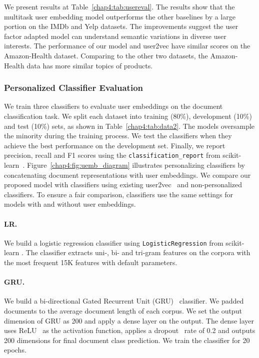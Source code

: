 We present results at Table~\ref{chap4:tab:usereval}.
The results show that the multitask user embedding model outperforms the other baselines by a large portion on the IMDb and Yelp datasets.
The improvements suggest the user factor adapted model can understand semantic variations in diverse user interests.
The performance of our model and user2vec have similar scores on the Amazon-Health dataset.
Comparing to the other two datasets, the Amazon-Health data has more similar topics of products.


\subsubsection{Personalized Classifier Evaluation}

We train three classifiers to evaluate user embeddings on the document classification task.
We split each dataset into training (80\%), development (10\%) and test (10\%) sets, as shown in Table~\ref{chap4:tab:data2}. 
The models oversample the minority during the training process.
We test the classifiers when they achieve the best performance on the development set.
Finally, we report precision, recall and F1 scores using the \texttt{classification\_report} from scikit-learn~\cite{pedregosa2011scikit}.
Figure~\ref{chap4:fig:uemb_diagram} illustrates personalizing classifiers by concatenating document representations with user embeddings.
We compare our proposed model with classifiers using existing user2vec~\cite{amir2017quantifying} and non-personalized classifiers.
To ensure a fair comparison, classifiers use the same settings for models with and without user embeddings.

\paragraph{LR.}
We build a logistic regression classifier using \texttt{LogisticRegression} from scikit-learn \cite{pedregosa2011scikit}. The classifier extracts uni-, bi- and tri-gram features on the corpora with the most frequent 15K features with default parameters. 


\paragraph{GRU.} 
We build a bi-directional Gated Recurrent Unit (GRU)~\cite{cho2014properties} classifier. We padded documents to the average document length of each corpus. We set the output dimension of GRU as 200 and apply a dense layer on the output. The dense layer uses ReLU~\cite{hahnloser2000digital} as the activation function, applies a dropout~\cite{srivastava2014dropout} rate of 0.2 and outputs 200 dimensions for final document class prediction. We train the classifier for 20 epochs.


